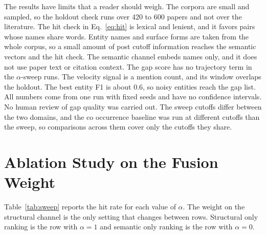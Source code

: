 \documentclass{ieeeaccess}
\begin{document}
The results have limits that a reader should weigh. The corpora are small and sampled, so the holdout check runs over 420 to 600 papers and not over the literature. The hit check in Eq.~\eqref{eq:hit} is lexical and lenient, and it favors pairs whose names share words. Entity names and surface forms are taken from the whole corpus, so a small amount of post cutoff information reaches the semantic vectors and the hit check. The semantic channel embeds names only, and it does not use paper text or citation context. The gap score has no trajectory term in the $\alpha$-sweep runs. The velocity signal is a mention count, and its window overlaps the holdout. The best entity F1 is about 0.6, so noisy entities reach the gap list. All numbers come from one run with fixed seeds and have no confidence intervals. No human review of gap quality was carried out. The sweep cutoffs differ between the two domains, and the co occurrence baseline was run at different cutoffs than the sweep, so comparisons across them cover only the cutoffs they share.

\section{Ablation Study on the Fusion Weight}
\label{sec:ablation}

Table~\ref{tab:sweep} reports the hit rate for each value of $\alpha$. The weight on the structural channel is the only setting that changes between rows. Structural only ranking is the row with $\alpha = 1$ and semantic only ranking is the row with $\alpha = 0$.

\begin{table}[t]
\caption{Hit rate in percent for each fusion weight $\alpha$, the weight on the structural channel. Each value is out of 75 pairs. The random baseline is drawn from the top 500 pairs at $\alpha = 0.5$.}
\label{tab:sweep}
\footnotesize
\setlength{\tabcolsep}{3pt}
\end{table}
\end{document}
